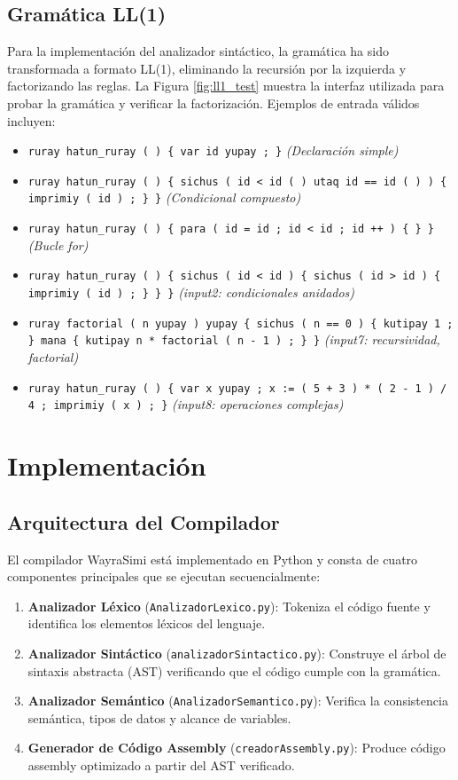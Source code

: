 \documentclass[conference]{IEEEtran}
\begin{document}
\subsection{Gramática LL(1)}

Para la implementación del analizador sintáctico, la gramática ha sido transformada a formato LL(1), eliminando la recursión por la izquierda y factorizando las reglas. La Figura \ref{fig:ll1_test} muestra la interfaz utilizada para probar la gramática y verificar la factorización. Ejemplos de entrada válidos incluyen:

\begin{itemize}
\item \texttt{ruray hatun\_ruray ( ) \{ var id yupay ; \}} \hfill \textit{(Declaración simple)}
\item \texttt{ruray hatun\_ruray ( ) \{ sichus ( id < id ( ) utaq id == id ( ) ) \{ imprimiy ( id ) ; \} \}} \hfill \textit{(Condicional compuesto)}
\item \texttt{ruray hatun\_ruray ( ) \{ para ( id = id ; id < id ; id ++ ) \{ \} \}} \hfill \textit{(Bucle for)}
\item \texttt{ruray hatun\_ruray ( ) \{ sichus ( id < id ) \{ sichus ( id > id ) \{ imprimiy ( id ) ; \} \} \}} \hfill \textit{(input2: condicionales anidados)}
\item \texttt{ruray factorial ( n yupay ) yupay \{ sichus ( n == 0 ) \{ kutipay 1 ; \} mana \{ kutipay n * factorial ( n - 1 ) ; \} \}} \hfill \textit{(input7: recursividad, factorial)}
\item \texttt{ruray hatun\_ruray ( ) \{ var x yupay ; x := ( 5 + 3 ) * ( 2 - 1 ) / 4 ; imprimiy ( x ) ; \}} \hfill \textit{(input8: operaciones complejas)}
\end{itemize}

\section{Implementación}

\subsection{Arquitectura del Compilador}

El compilador WayraSimi está implementado en Python y consta de cuatro componentes principales que se ejecutan secuencialmente:

\begin{enumerate}
\item \textbf{Analizador Léxico} (\texttt{AnalizadorLexico.py}): Tokeniza el código fuente y identifica los elementos léxicos del lenguaje.
\item \textbf{Analizador Sintáctico} (\texttt{analizadorSintactico.py}): Construye el árbol de sintaxis abstracta (AST) verificando que el código cumple con la gramática.
\item \textbf{Analizador Semántico} (\texttt{AnalizadorSemantico.py}): Verifica la consistencia semántica, tipos de datos y alcance de variables.
\item \textbf{Generador de Código Assembly} (\texttt{creadorAssembly.py}): Produce código assembly optimizado a partir del AST verificado.
\end{enumerate}
\end{document}
